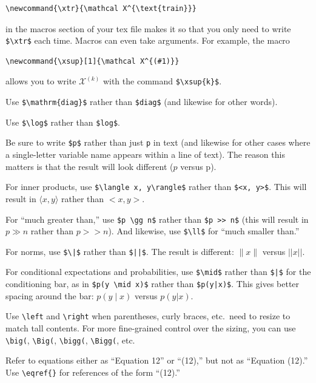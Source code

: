 \documentclass[11pt]{article}
\begin{document}
\begin{todolist}
\begin{todolist}
\begin{verbatim}
\newcommand{\xtr}{\mathcal X^{\text{train}}}
\end{verbatim}
in the macros section of your tex file makes it so that you only need to write
\verb+$\xtr$+ each time.  Macros can even take arguments.  For example,
the macro

\begin{verbatim}
\newcommand{\xsup}[1]{\mathcal X^{(#1)}}
\end{verbatim}

allows you to write $\mathcal X^{(k)}$ with the command \verb+$\xsup{k}$+.


  
\item Use \verb+$\mathrm{diag}$+ rather than \verb+$diag$+ (and
  likewise for other words).
  \item Use \verb+$\log$+ rather than \verb+$log$+.
\item Be sure to write \verb+$p$+ rather than just \verb+p+ in text (and likewise
  for other cases where a single-letter variable name appears within a
  line of text).  The reason this matters is that the result will look
  different ($p$ versus p).
\item For inner products, use \verb+$\langle x, y\rangle$+ rather than
  \verb+$<x, y>$+. This will result in $\langle x, y\rangle$ rather
  than $<x, y>$.
\item For ``much greater than,'' use \verb+$p \gg n$+ rather than
  \verb+$p >> n$+ (this will result in $p \gg n$ rather than $p >>
  n$).  And likewise, use \verb+$\ll$+ for ``much smaller than.''
\item For norms, use \verb+$\|$+ rather than \verb+$||$+.  The result
  is different: $\|x\|$ versus $||x||$.
\item For conditional expectations and probabilities, use \verb+$\mid$+
  rather than \verb+$|$+ for the conditioning bar, as in
  \verb+$p(y \mid x)$+ rather than \verb+$p(y|x)$+.  This gives better
  spacing around the bar: $p(y \mid x)$ versus $p(y|x)$.
  \item Use \verb+\left+ and \verb+\right+ when parentheses,
    curly braces, etc.\ need to resize to match tall contents.
    For more fine-grained control over the sizing, you
    can use \verb+\big(+, \verb+\Big(+, \verb+\bigg(+, \verb+\Bigg(+, etc.
    \item Refer to equations either as ``Equation 12'' or ``(12),'' but
      not as ``Equation (12).''  Use \verb+\eqref{}+ for references of
      the form ``(12).''

\end{todolist}
\end{todolist}
\end{document}
